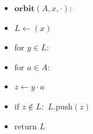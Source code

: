 \documentclass{standalone}
\begin{document}
\begin{minipage}{0.9\linewidth}
  \begin{itemize}\setlength{\itemsep}{-4pt}
  \item[] $\mathbf{orbit}(A, x, {\cdot}):$
  \item[] \quad $L \gets (x)$
  \item[] \quad $\text{for } y \in L:$
  \item[] \quad \quad $\text{for } a \in A:$
  \item[] \quad \quad \quad $z \gets y \cdot a$
  \item[] \quad \quad \quad $\text{if } z \notin L:$ $L.\text{push}(z)$
  \item[] \quad $\text{return }L$
  \end{itemize}
\end{minipage}
\end{document}
